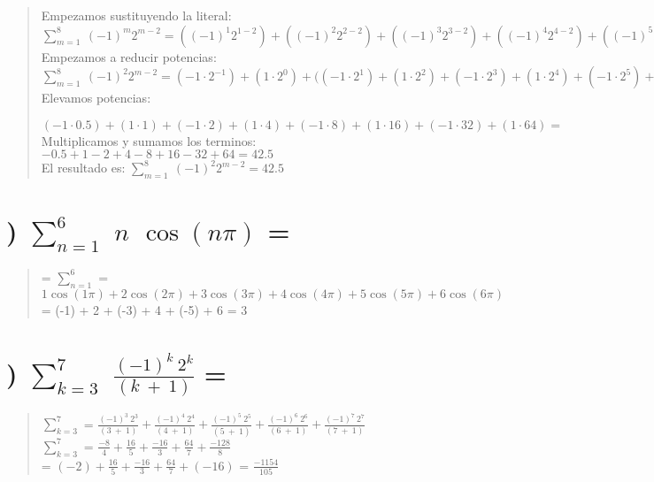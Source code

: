\documentclass[12pt]{article}
\begin{document}
\begin{quote}
  \fontsize{15}{25}\selectfont
  Empezamos sustituyendo la literal: \\
  $\sum _{m=1}^8\:\left(-1\right)^m 2^{m-2}=((-1)^1 2^{1-2})+((-1)^2 2^{2-2})+((-1)^3 2^{3-2})+((-1)^4 2^{4-2})+((-1)^5 2^{5-2})+((-1)^6 2^{6-2})+((-1)^7 2^{7-2})+((-1)^8 2^{8-2})$
  Empezamos a reducir potencias:
  $\sum _{m=1}^8\:\left(-1\right)^2 2^{m-2}=(-1\cdot2^{-1})+(1\cdot 2^{0})+((-1\cdot 2^{1})+(1\cdot 2^{2})+(-1\cdot 2^{3})+(1\cdot 2^{4})+(-1\cdot 2^{5})+(1\cdot 2^{6})=$ \\
  Elevamos potencias:

  $(-1\cdot0.5)+(1\cdot1)+(-1\cdot2)+(1\cdot4)+(-1\cdot8)+(1\cdot16)+(-1\cdot32)+(1\cdot64)=$ \\
  Multiplicamos y sumamos los terminos:
  $-0.5+1-2+4-8+16-32+64=42.5$ \\
  El resultado es:
  $\sum _{m=1}^8\:\left(-1\right)^2 2^{m-2}=42.5$
\end{quote}


\newpage

\fontsize{15}{40}\selectfont
\section*{) $\sum_{n = 1}^{6}$ $n$ $\cos(n\pi)$ =} \label{sumatoria:problema_3}


\begin{quote}
  \fontsize{12}{30}\selectfont
  = $\sum_{n = 1}^{6}$ = $  1 \cos(1\pi)  + 2 \cos(2\pi) + 3 \cos(3\pi) + 4 \cos(4\pi) + 5 \cos(5\pi) + 6 \cos(6\pi)$ \\
  = (-1) + 2 + (-3) + 4 + (-5) + 6 = 3
\end{quote}

\fontsize{15}{40}\selectfont
\section*{) $\sum_{k = 3}^{7}$ \fontsize{17}{40} $\frac{(-1)^k\ 2^k}{(k\ +\ 1)}$ =} \label{sumatoria:problema_4}


\begin{quote}
  \fontsize{14}{30}\selectfont
  $\sum_{k = 3}^{7} $ = $ \frac{(-1)^3\ 2^3}{(3\ +\ 1)} + \frac{(-1)^4\ 2^4}{(4\ +\ 1)} + \frac{(-1)^5\ 2^5}{(5\ +\ 1)} + \frac{(-1)^6\ 2^6}{(6\ +\ 1)} + \frac{(-1)^7\ 2^7}{(7\ +\ 1)} $ \\
  $\sum_{k = 3}^{7} $ = $\frac{-8}{4} + \frac{16}{5} + \frac{-16}{3} + \frac{64}{7} + \frac{-128}{8} $ \\
  = \fontsize{12}{30}\selectfont $(-2) + \frac{16}{5} + \frac{-16}{3} + \frac{64}{7} + (-16)$ = $\frac{-1154}{105}$
\end{quote}
\end{document}

